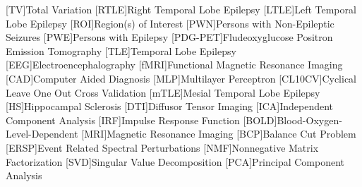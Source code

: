 \documentclass{article}
\title{\vspace{-15ex }}
\date{}
\begin{document}
[TV]{Total Variation}
[RTLE]{Right Temporal Lobe Epilepsy}
[LTLE]{Left Temporal Lobe Epilepsy}
[ROI]{Region(s) of Interest}
[PWN]{Persons with Non-Epileptic Seizures}
[PWE]{Persons with Epilepsy}
[PDG-PET]{Fludeoxyglucose Positron Emission Tomography}
[TLE]{Temporal Lobe Epilepsy}
[EEG]{Electroencephalography}
[fMRI]{Functional Magnetic Resonance Imaging}
[CAD]{Computer Aided Diagnosis}
[MLP]{Multilayer Perceptron}
[CL10CV]{Cyclical Leave One Out Cross Validation}
[mTLE]{Mesial Temporal Lobe Epilepsy}
[HS]{Hippocampal Sclerosis}
[DTI]{Diffusor Tensor Imaging}
[ICA]{Independent Component Analysis}
[IRF]{Impulse Response Function}
[BOLD]{Blood-Oxygen-Level-Dependent}
[MRI]{Magnetic Resonance Imaging}
[BCP]{Balance Cut Problem}
[ERSP]{Event Related Spectral Perturbations}
[NMF]{Non\-negative Matrix Factorization}
[SVD]{Singular Value Decomposition}
[PCA]{Principal Component Analysis}

\maketitle


\nocite{*}
\end{document}
